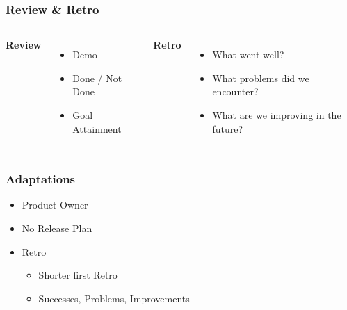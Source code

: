 \begin{frame}
    \frametitle{Review \& Retro}
    \begin{columns}
    \large
    \textbf{Review}
    \begin{itemize}
        \large
        \item Demo
        \item Done / Not Done
        \item Goal Attainment
    \end{itemize}
    \large
    \textbf{Retro}
    \begin{itemize}
        \large
        \item What went well?
        \item What problems did we encounter?
        \item What are we improving in the future?
    \end{itemize}
    \end{columns}
\end{frame}

\begin{frame}
    \frametitle{Adaptations}
    \begin{itemize}
        \large
        \item Product Owner
        \item No Release Plan
        \item Retro
        \begin{itemize}
            \large
            \item Shorter first Retro
            \item Successes, Problems, Improvements 
        \end{itemize}
    \end{itemize}
\end{frame}
